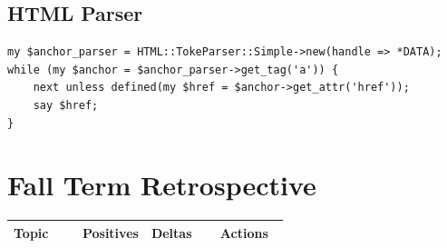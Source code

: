 \documentclass[letterpaper,10pt,titlepage,draftclsnofoot,onecolumn,onesided] {IEEEtran}
\begin{document}
	\subsection{HTML Parser}
	\begin{lstlisting}
my $anchor_parser = HTML::TokeParser::Simple->new(handle => *DATA);
while (my $anchor = $anchor_parser->get_tag('a')) {
    next unless defined(my $href = $anchor->get_attr('href'));
    say $href;
}
	\end{lstlisting}
	
\pagebreak
\section{Fall Term Retrospective}
	\begin{center}
	\begin{singlespace}
		\begin{tabular}{ |  p{0.25\linewidth}  |  p{0.25\linewidth}  | p{0.25\linewidth} | p{0.25\linewidth} |}
		\hline
		Topic & Positives & Deltas & Actions \\ \hline
		

\end{tabular}
\end{singlespace}
\end{center}
\end{document}
